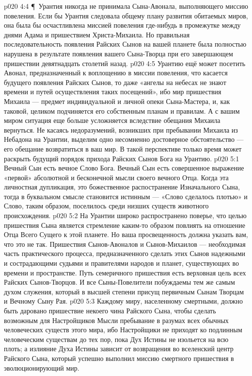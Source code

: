 \vs p020 4:4 \P\ Урантия никогда не принимала Сына\hyp{}Авонала, выполняющего миссию повеления. Если бы Урантия следовала общему плану развития обитаемых миров, она была бы осчастливлена миссией повеления где\hyp{}нибудь в промежутке между днями Адама и пришествием Христа\hyp{}Михаила. Но правильная последовательность появления Райских Сынов на вашей планете была полностью нарушена в результате появления вашего Сына\hyp{}Творца при его завершающем пришествии девятнадцать столетий назад.
\vs p020 4:5 Урантию ещё может посетить Авонал, предназначенный к воплощению в миссии повеления, что касается будущего появления Райских Сынов, то даже «ангелы на небесах не знают времени и путей осуществления таких посещений», ибо мир пришествия Михаила --- предмет индивидуальной и личной опеки Сына\hyp{}Мастера, и, как таковой, целиком подчиняется его собственным планам и правилам. А с вашим миром ситуация еще больше усложняется вследствие обещания Михаила вернуться. Не касаясь недоразумений, возникших при пребывании Михаила из Небадона на Урантии, выделим одно несомненно достоверное обстоятельство --- его обещание возвратиться в ваш мир. В такой перспективе только время может раскрыть будущий порядок прихода Райских Сынов Бога на Урантию.
\vs p020 5:1 Вечный Сын есть вечное Слово Бога. Вечный Сын есть совершенное выражение «первой» абсолютной и бесконечной мысли своего вечного Отца. Когда эта личностная дупликация, это божественное распостранение Изначального Сына, тогда в буквальном смысле становится истинным --- «Слово сделалось плотью» и Слово, таким образом, поселилось среди низших существ животного происхождения.
\vs p020 5:2 На Урантии широко распространено поверье, что целью пришествия Сына является стремление каким\hyp{}то образом повлиять на отношение Отца Всего Сущего к этой планете. Но ваша просвещенность должна указать вам, что это не так. Пришествия Сынов\hyp{}Авоналов и Сынов\hyp{}Михаилов --- необходимая часть практического процесса, предназначенного сделать этих Сынов надежными и сострадающими судьями и правителями народов и планет, существующих во времени и пространстве. Путь семеричного пришествия есть верховная цель всех Райских Сынов\hyp{}Творцов. И все Сыны\hyp{}Повелители побуждаемы тем же самым духом служения, который в высшей степени присущ первичным Сынам Творцам и Вечному Сыну Рая.
\vs p020 5:3 Каждому миру, населенному смертными, должно быть даровано пришествие некоего чина Райского Сына, чтобы сделать возможным для Настройщиков Мысли пребывание в разумах всех обычных человеческих существ этого мира, ибо Настройщики не приходят ко  подлинным человеческим существам до тех пор, пока Дух Истины не изольется на всю плоть; а излияние Духа Истины зависит от возвращения во вселенский центр Райского Сына, который успешно выполнил миссию смертного пришествия в эволюционирующий мир.
